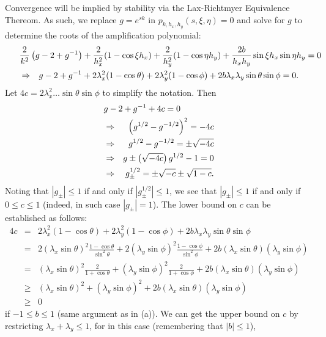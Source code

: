 \documentclass{article}
\begin{document}
\begin{enumerate}
\begin{enumerate}
Convergence will be implied by stability via the Lax-Richtmyer Equivalence Thereom.  As such, we replace \(g = e^{sk}\) in \(p_{k,h_x,h_y}(s,\xi,\eta) = 0\) and solve for \(g\) to determine the roots of the amplification polynomial:
\begin{eqnarray*}
\lefteqn{\frac{2}{k^2} \left( g - 2 + g^{-1} \right)
  + \frac{2}{h_x^2} (1 - \cos \xi h_x)
  + \frac{2}{h_y^2} (1 - \cos \eta h_y)
  + \frac{2b}{h_xh_y} \sin \xi h_x \sin \eta h_y = 0} \\
& \Rightarrow & g - 2 + g^{-1} + 2 \lambda_x^2 (1 - \cos \theta) + 2 \lambda_y^2 (1 - \cos \phi) + 2b \lambda_x \lambda_y \sin \theta \sin \phi = 0.
\end{eqnarray*}
Let \(4c = 2 \lambda_x^2 \ldots \sin \theta \sin \phi\) to simplify the notation.  Then
\begin{eqnarray*}
\lefteqn{g - 2 + g^{-1} + 4c = 0} \\
& \Rightarrow & \left( g^{1/2} - g^{-1/2} \right)^2 = -4c \\
& \Rightarrow & g^{1/2} - g^{-1/2} = \pm \sqrt{-4c} \\
& \Rightarrow & g \pm \left( \sqrt{-4c} \right) g^{1/2} - 1 = 0 \\
& \Rightarrow & g_{\pm}^{1/2} = \pm \sqrt{-c} \pm \sqrt{1 - c}.
\end{eqnarray*}
Noting that \(|g_{\pm}| \leq 1\) if and only if \(\left| g_{\pm}^{1/2} \right| \leq 1\), we see that \(|g_{\pm}| \leq 1\) if and only if \(0 \leq c \leq 1\) (indeed, in such case \(|g_{\pm}| = 1\)).  The lower bound on \(c\) can be established as follows:
\begin{eqnarray*}
4c &   =  & 2\lambda_x^2 (1 - \cos \theta)
          + 2\lambda_y^2 (1 - \cos \phi)
          + 2b \lambda_x \lambda_y \sin \theta \sin \phi \\
   &   =  & 2(\lambda_x \sin \theta)^2 \frac{1 - \cos \theta}{\sin^2 \theta}
          + 2(\lambda_y \sin \phi)^2 \frac{1 - \cos \phi}{\sin^2 \phi}
          + 2b (\lambda_x \sin \theta) (\lambda_y \sin \phi) \\
   &   =  & (\lambda_x \sin \theta)^2 \frac{2}{1 + \cos \theta}
          + (\lambda_y \sin \phi)^2 \frac{2}{1 + \cos \phi}
          + 2b (\lambda_x \sin \theta) (\lambda_y \sin \phi) \\
   & \geq & (\lambda_x \sin \theta)^2
          + (\lambda_y \sin \phi)^2
          + 2b (\lambda_x \sin \theta) (\lambda_y \sin \phi) \\
   & \geq & 0
\end{eqnarray*}
if \(-1 \leq b \leq 1\) (same argument as in (a)).  We can get the upper bound on \(c\) by restricting \(\lambda_x + \lambda_y \leq 1\), for in this case (remembering that \(|b| \leq 1\)),

\end{enumerate}
\end{enumerate}
\end{document}
